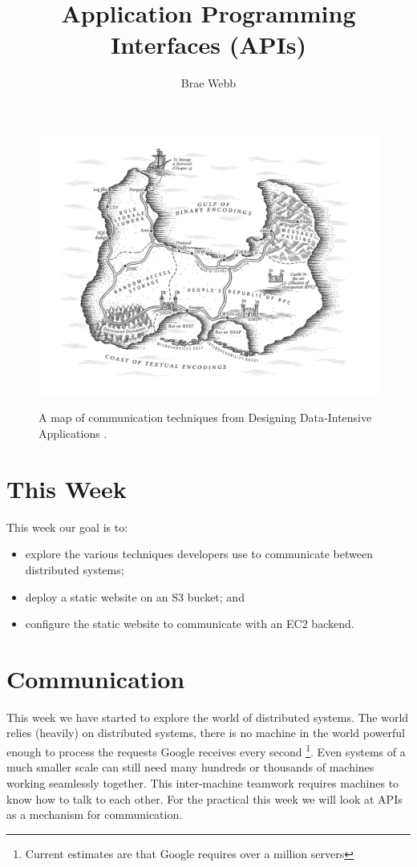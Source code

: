 \documentclass{csse4400}
\title{Application Programming Interfaces (APIs)}
\author{Brae Webb}
\date{\week{5}}
\begin{document}
\maketitle

\begin{figure}[h]
  \href{https://www.oreilly.com/library/view/designing-data-intensive-applications/9781491903063/ch04.html}{
    \includegraphics[width=\textwidth]{images/communication}
  }
\caption{A map of communication techniques from Designing Data-Intensive Applications \cite{data-intensive}.}
\end{figure}

\section{This Week}
This week our goal is to:
\begin{itemize}
  \item explore the various techniques developers use to communicate between distributed systems;
  \item deploy a static website on an S3 bucket; and
  \item configure the static website to communicate with an EC2 backend.
\end{itemize}


\section{Communication}
This week we have started to explore the world of distributed systems.
The world relies (heavily) on distributed systems,
there is no machine in the world powerful enough to process the requests Google receives every second%
\footnote{Current estimates are that Google requires over a million servers}.
Even systems of a much smaller scale can still need many hundreds or thousands of machines working seamlessly together.
This inter-machine teamwork requires machines to know how to talk to each other.
For the practical this week we will look at APIs as a mechanism for communication.
\end{document}
